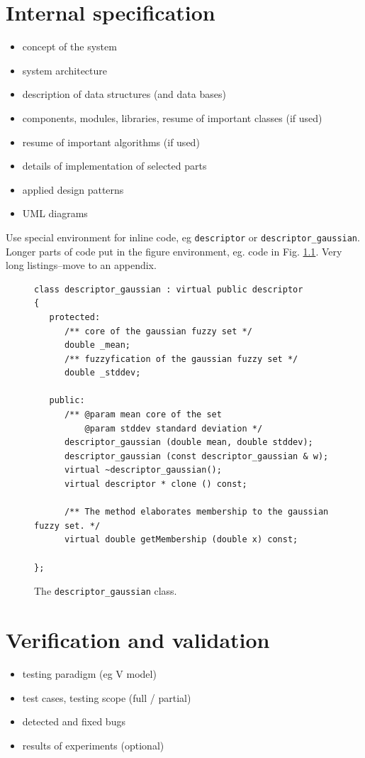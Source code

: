\documentclass[a4paper,twoside,12pt]{book}
\begin{document}
\chapter{Internal specification}

\begin{itemize}
\item concept of the system
\item system architecture
\item description of data structures (and data bases)
\item components, modules, libraries, resume of important classes (if used)
\item resume of important algorithms (if used)
\item details of implementation of selected parts
\item applied design patterns
\item UML diagrams
\end{itemize}


Use special environment for inline code, eg \lstinline|descriptor| or \lstinline|descriptor_gaussian|. 
Longer parts of code put in the figure environment, eg. code in Fig. \ref{fig:pseudokod}. Very long listings–move to an appendix.

\begin{figure}
\centering
\begin{lstlisting}
class descriptor_gaussian : virtual public descriptor
{
   protected:
      /** core of the gaussian fuzzy set */
      double _mean;
      /** fuzzyfication of the gaussian fuzzy set */
      double _stddev;
      
   public:
      /** @param mean core of the set
          @param stddev standard deviation */
      descriptor_gaussian (double mean, double stddev);
      descriptor_gaussian (const descriptor_gaussian & w);
      virtual ~descriptor_gaussian();
      virtual descriptor * clone () const;
      
      /** The method elaborates membership to the gaussian fuzzy set. */
      virtual double getMembership (double x) const;
     
};
\end{lstlisting}
\caption{The \lstinline|descriptor_gaussian| class.}
\label{fig:pseudokod}
\end{figure}


\chapter{Verification and validation}
\begin{itemize}
\item testing paradigm (eg V model)
\item test cases, testing scope (full / partial)
\item detected and fixed bugs
\item results of experiments (optional)
\end{itemize}
\end{document}
